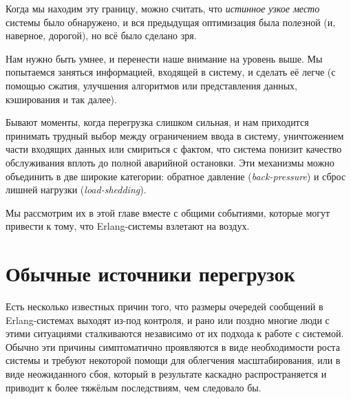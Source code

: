 \documentclass[11pt, oneside]{book}   	%
\begin{document}
Когда мы находим эту границу, можно считать, что \emph{истинное узкое место} системы было обнаружено, и вся предыдущая оптимизация была полезной (и, наверное, дорогой), но всё было сделано зря.

Нам нужно быть умнее, и перенести наше внимание на уровень выше. Мы попытаемся заняться информацией, входящей в систему, и сделать её легче (с помощью сжатия, улучшения алгоритмов или представления данных, кэширования и так далее).

Бывают моменты, когда перегрузка слишком сильная, и нам приходится принимать трудный выбор между ограничением ввода в систему, уничтожением части входящих данных или смириться с фактом, что система понизит качество обслуживания вплоть до полной аварийной остановки. Эти механизмы можно объединить в две широкие категории: обратное давление (\emph{back-pressure}) и сброс лишней нагрузки (\emph{load-shedding}).

Мы рассмотрим их в этой главе вместе с общими событиями, которые могут привести к тому, что Erlang-системы взлетают на воздух.


\section{Обычные источники перегрузок}

Есть несколько известных причин того, что размеры очередей сообщений в Erlang-системах выходят из-под контроля, и рано или поздно многие люди с этими ситуациями сталкиваются независимо от их подхода к работе с системой. Обычно эти причины симптоматично проявляются в виде необходимости роста системы и требуют некоторой помощи для облегчения масштабирования, или в виде неожиданного сбоя, который в результате каскадно распространяется и приводит к более тяжёлым последствиям, чем следовало бы.
\end{document}
